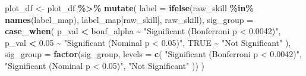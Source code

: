 \documentclass[
]{article}
\newenvironment{Shaded}{\begin{snugshade}}{\end{snugshade}}
\newcommand{\AttributeTok}[1]{\textcolor[rgb]{0.13,0.29,0.53}{#1}}
\newcommand{\ConstantTok}[1]{\textcolor[rgb]{0.56,0.35,0.01}{#1}}
\newcommand{\FloatTok}[1]{\textcolor[rgb]{0.00,0.00,0.81}{#1}}
\newcommand{\FunctionTok}[1]{\textcolor[rgb]{0.13,0.29,0.53}{\textbf{#1}}}
\newcommand{\NormalTok}[1]{#1}
\newcommand{\OtherTok}[1]{\textcolor[rgb]{0.56,0.35,0.01}{#1}}
\newcommand{\SpecialCharTok}[1]{\textcolor[rgb]{0.81,0.36,0.00}{\textbf{#1}}}
\newcommand{\StringTok}[1]{\textcolor[rgb]{0.31,0.60,0.02}{#1}}
\begin{document}
\begin{Shaded}
\begin{Highlighting}[]
\NormalTok{plot\_df }\OtherTok{\textless{}{-}}\NormalTok{ plot\_df }\SpecialCharTok{\%\textgreater{}\%}
  \FunctionTok{mutate}\NormalTok{(}
    \AttributeTok{label =} \FunctionTok{ifelse}\NormalTok{(raw\_skill }\SpecialCharTok{\%in\%} \FunctionTok{names}\NormalTok{(label\_map), label\_map[raw\_skill], raw\_skill),}
    \AttributeTok{sig\_group =} \FunctionTok{case\_when}\NormalTok{(}
\NormalTok{      p\_val }\SpecialCharTok{\textless{}}\NormalTok{ bonf\_alpha }\SpecialCharTok{\textasciitilde{}} \StringTok{"Significant (Bonferroni p \textless{} 0.0042)"}\NormalTok{,}
\NormalTok{      p\_val }\SpecialCharTok{\textless{}} \FloatTok{0.05}       \SpecialCharTok{\textasciitilde{}} \StringTok{"Significant (Nominal p \textless{} 0.05)"}\NormalTok{,}
      \ConstantTok{TRUE}               \SpecialCharTok{\textasciitilde{}} \StringTok{"Not Significant"}
\NormalTok{    ),}
    \AttributeTok{sig\_group =} \FunctionTok{factor}\NormalTok{(sig\_group, }\AttributeTok{levels =} \FunctionTok{c}\NormalTok{(}
      \StringTok{"Significant (Bonferroni p \textless{} 0.0042)"}\NormalTok{,}
      \StringTok{"Significant (Nominal p \textless{} 0.05)"}\NormalTok{,}
      \StringTok{"Not Significant"}
\NormalTok{    ))}
\NormalTok{  )}


\end{Highlighting}
\end{Shaded}
\end{document}

